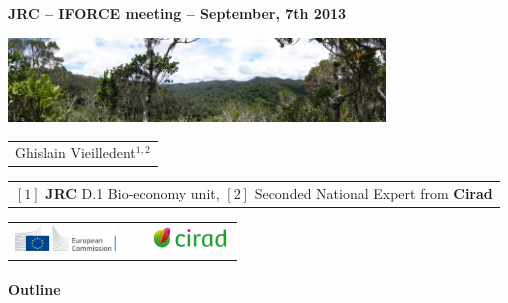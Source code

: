 {

  \begin{frame}[plain]
    \begin{center}
      \small{\textbf{JRC -- IFORCE meeting -- September, 7th 2013}}
    \end{center}
    \vspace{-0.5cm}
    \titlepage %
    \vspace{-2.5cm}
    \begin{center}
      \includegraphics[width=10cm]{figs/Banniere.png}
    \end{center}
    \begin{center}

      {\footnotesize
        \begin{tabular}{c}
          Ghislain Vieilledent$^{1,2}$
        \end{tabular}
      }

      \vspace{0.25cm}

      {\scriptsize
        \begin{tabular}{c}
          $[1]$ \textbf{JRC} D.1 Bio-economy unit,
          $[2]$ Seconded National Expert from \textbf{Cirad}
        \end{tabular}
      }

      \vspace{0.25cm}

      \begin{tabular}{C{2cm}C{1cm}C{2cm}}
        \includegraphics[height=0.7cm]{figs/Logo-JRC.jpg} &
        ~ &
        \includegraphics[height=0.7cm]{figs/Logo-Cirad.png}\\
      \end{tabular}

    \end{center}
    
  \end{frame}
}


\placelogotrue
\begin{frame}
  \framesubtitle{Outline}
  \begin{columns}[c]
    \begin{column}{0.5\textwidth}
      \tableofcontents[sections={1-2}]
    \end{column}
    \begin{column}{0.5\textwidth}
      \tableofcontents[sections={3-4}]
    \end{column}
  \end{columns}
\end{frame}
\placelogofalse